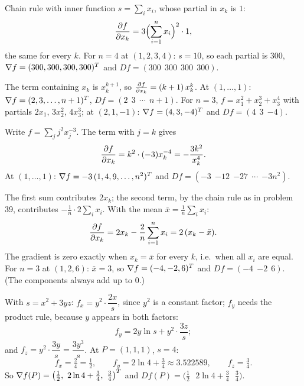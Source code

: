 \begin{solutions}
  \item Chain rule with inner function $s=\sum_{i}x_{i}$, whose partial in
        $x_{k}$ is $1$:
        \[
          \frac{\partial f}{\partial x_{k}}=3\Bigl(\sum_{i=1}^{n}x_{i}\Bigr)^{2}\cdot1 ,
        \]
        the same for every $k$. For $n=4$ at $(1,2,3,4)$: $s=10$, so each
        partial is $300$, $\nabla f=(300,300,300,300)^{T}$ and
        $Df=(300\ \ 300\ \ 300\ \ 300)$.

  \item The term containing $x_{k}$ is $x_{k}^{k+1}$, so
        $\frac{\partial f}{\partial x_{k}}=(k+1)\,x_{k}^{k}$. At $(1,\ldots,1)$:
        $\nabla f=(2,3,\ldots,n+1)^{T}$, $Df=(2\ \ 3\ \ \cdots\ \ n+1)$. For
        $n=3$, $f=x_{1}^{2}+x_{2}^{3}+x_{3}^{4}$ with partials
        $2x_{1},\,3x_{2}^{2},\,4x_{3}^{3}$; at $(2,1,-1)$:
        $\nabla f=(4,3,-4)^{T}$ and $Df=(4\ \ 3\ \ {-4})$.

  \item Write $f=\sum_{j}j^{2}x_{j}^{-3}$. The term with $j=k$ gives
        \[
          \frac{\partial f}{\partial x_{k}}=k^{2}\cdot(-3)x_{k}^{-4}=-\frac{3k^{2}}{x_{k}^{4}} .
        \]
        At $(1,\ldots,1)$: $\nabla f=-3\,(1,4,9,\ldots,n^{2})^{T}$ and
        $Df=(-3\ \ {-12}\ \ {-27}\ \ \cdots\ \ {-3n^{2}})$.

  \item The first sum contributes $2x_{k}$; the second term, by the chain
        rule as in problem 39, contributes
        $-\tfrac1n\cdot2\sum_{i}x_{i}$. With the mean
        $\bar x=\tfrac1n\sum_{i}x_{i}$:
        \[
          \frac{\partial f}{\partial x_{k}}=2x_{k}-\frac2n\sum_{i=1}^{n}x_{i}=2\,(x_{k}-\bar x) .
        \]
        The gradient is zero exactly when $x_{k}=\bar x$ for every $k$,
        i.e.\ when all $x_{i}$ are equal. For $n=3$ at $(1,2,6)$:
        $\bar x=3$, so $\nabla f=(-4,-2,6)^{T}$ and $Df=(-4\ \ {-2}\ \ 6)$.
        (The components always add up to $0$.)

  \item With $s=x^{2}+3yz$: $f_{x}=y^{2}\cdot\dfrac{2x}{s}$, since
        $y^{2}$ is a constant factor; $f_{y}$ needs the product rule,
        because $y$ appears in both factors:
        \[
          f_{y}=2y\ln s+y^{2}\cdot\frac{3z}{s};
        \]
        and $f_{z}=y^{2}\cdot\dfrac{3y}{s}=\dfrac{3y^{3}}{s}$. At
        $P=(1,1,1)$, $s=4$:
        \[
          f_{x}=\tfrac24=\tfrac12,\qquad
          f_{y}=2\ln4+\tfrac34\approx3.522589,\qquad
          f_{z}=\tfrac34 .
        \]
        So $\grad f(P)=\bigl(\tfrac12,\ 2\ln4+\tfrac34,\ \tfrac34\bigr)^{T}$
        and $Df(P)=\bigl(\tfrac12\ \ \ 2\ln4+\tfrac34\ \ \ \tfrac34\bigr)$.


\end{solutions}

